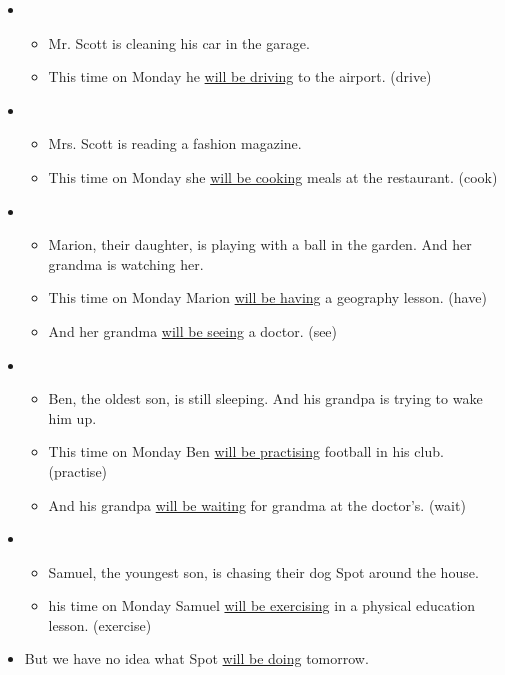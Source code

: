 \begin{itemize}

\item
\begin{itemize}
\item Mr. Scott is cleaning his car in the garage.
\item This time on Monday he \underline{will be driving} to the airport. (drive)
\end{itemize}

\item
\begin{itemize}
\item Mrs. Scott is reading a fashion magazine.
\item This time on Monday she \underline{will be cooking} meals at the restaurant. (cook)
\end{itemize}

\item
\begin{itemize}
\item Marion, their daughter, is playing with a ball in the garden. And her grandma is watching her.
\item This time on Monday Marion \underline{will be having} a geography lesson. (have)
\item And her grandma \underline{will be seeing} a doctor. (see)
\end{itemize}

\item
\begin{itemize}
\item Ben, the oldest son, is still sleeping. And his grandpa is trying to wake him up.
\item This time on Monday Ben \underline{will be practising} football in his club. (practise)
\item And his grandpa \underline{will be waiting} for grandma at the doctor's. (wait)
\end{itemize}

\item
\begin{itemize}
\item Samuel, the youngest son, is chasing their dog Spot around the house.
\item his time on Monday Samuel \underline{will be exercising} in a physical education lesson. (exercise)
\end{itemize}

\item But we have no idea what Spot \underline{will be doing} tomorrow.

\end{itemize}

